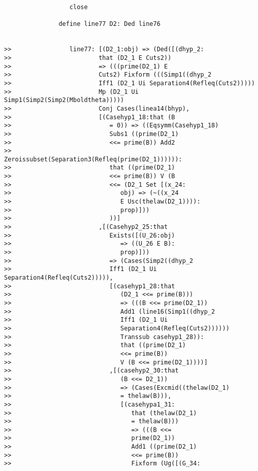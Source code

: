 \documentclass[12pt]{article}
\begin{document}
\begin{verbatim}
                  close

               define line77 D2: Ded line76


>>                line77: [(D2_1:obj) => (Ded([(dhyp_2:
>>                        that (D2_1 E Cuts2))
>>                        => (((prime(D2_1) E
>>                        Cuts2) Fixform (((Simp1((dhyp_2
>>                        Iff1 (D2_1 Ui Separation4(Refleq(Cuts2)))))
>>                        Mp (D2_1 Ui Simp1(Simp2(Simp2(Mboldtheta)))))
>>                        Conj Cases(linea14(bhyp),
>>                        [(Casehyp1_18:that (B
>>                           = 0)) => ((Eqsymm(Casehyp1_18)
>>                           Subs1 ((prime(D2_1)
>>                           <<= prime(B)) Add2
>>                           Zeroissubset(Separation3(Refleq(prime(D2_1)))))):
>>                           that ((prime(D2_1)
>>                           <<= prime(B)) V (B
>>                           <<= (D2_1 Set [(x_24:
>>                              obj) => (~((x_24
>>                              E Usc(thelaw(D2_1)))):
>>                              prop)]))
>>                           ))]
>>                        ,[(Casehyp2_25:that
>>                           Exists([(U_26:obj)
>>                              => ((U_26 E B):
>>                              prop)]))
>>                           => (Cases(Simp2((dhyp_2
>>                           Iff1 (D2_1 Ui Separation4(Refleq(Cuts2))))),
>>                           [(casehyp1_28:that
>>                              (D2_1 <<= prime(B)))
>>                              => (((B <<= prime(D2_1))
>>                              Add1 (line16(Simp1((dhyp_2
>>                              Iff1 (D2_1 Ui
>>                              Separation4(Refleq(Cuts2))))))
>>                              Transsub casehyp1_28)):
>>                              that ((prime(D2_1)
>>                              <<= prime(B))
>>                              V (B <<= prime(D2_1))))]
>>                           ,[(casehyp2_30:that
>>                              (B <<= D2_1))
>>                              => (Cases(Excmid((thelaw(D2_1)
>>                              = thelaw(B))),
>>                              [(casehypa1_31:
>>                                 that (thelaw(D2_1)
>>                                 = thelaw(B)))
>>                                 => (((B <<=
>>                                 prime(D2_1))
>>                                 Add1 ((prime(D2_1)
>>                                 <<= prime(B))
>>                                 Fixform (Ug([(G_34:

\end{verbatim}
\end{document}
